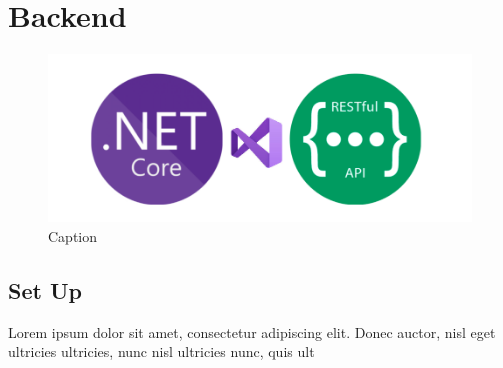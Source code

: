 \chapter{Backend}
\begin{figure}[H]
\centering
\includegraphics[width=1\textwidth]{Images/dotnet.png}
\caption{\label{fig:backend}Caption}
\end{figure}
\section{Set Up}

Lorem ipsum dolor sit amet, consectetur adipiscing elit. Donec auctor, nisl eget ultricies ultricies, nunc nisl ultricies nunc, quis ult
